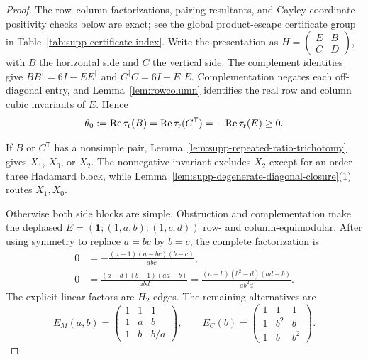 \begin{proof}
The row--column factorizations, pairing resultants, and Cayley-coordinate positivity checks below are exact; see the global product-escape certificate group in Table~\ref{tab:supp-certificate-index}.
{Write the presentation as $H=\left(\begin{smallmatrix}E&B\\C&D\end{smallmatrix}\right)$, with $B$ the horizontal side and $C$ the vertical side.  The complement identities give $BB^\dagger=6I-EE^\dagger$ and $C^\dagger C=6I-E^\dagger E$.  Complementation negates each off-diagonal entry, and Lemma~\ref{lem:rowcolumn} identifies the real row and column cubic invariants of $E$. Hence}
\begin{equation}
{\theta_0:=\operatorname{Re}\tau_{\rm r}(B)
=\operatorname{Re}\tau_{\rm r}(C^{\mathsf T})
=-\operatorname{Re}\tau_{\rm r}(E)\ge0.}
\label{eq:supp-two-sided-common-invariant}
\end{equation}

{If $B$ or $C^{\mathsf T}$ has a nonsimple pair, Lemma~\ref{lem:supp-repeated-ratio-trichotomy} gives $X_1$, $X_0$, or $X_2$.  The nonnegative invariant excludes $X_2$ except for an order-three Hadamard block, while Lemma~\ref{lem:supp-degenerate-diagonal-closure}(1) routes $X_1,X_0$.}

{Otherwise both side blocks are simple.  Obstruction and complementation make the dephased $E=(\mathbf1;(1,a,b);(1,c,d))$ row- and column-equimodular.  After using symmetry to replace $a=bc$ by $b=c$, the complete factorization is}
\begin{align}
{0}&{=-\frac{(a+1)(a-bc)(b-c)}{abc},}
\label{eq:supp-biequimodular-first-split}\\
{0}&{=\frac{(a-d)(b+1)(ad-b)}{abd}
=\frac{(a+b)(b^2-d)(ad-b)}{ab^2d}.}
\label{eq:supp-biequimodular-second-split}
\end{align}
{The explicit linear factors are $H_2$ edges. The remaining alternatives are}
\begin{equation}
{E_M(a,b)=\begin{pmatrix}1&1&1\\1&a&b\\1&b&b/a\end{pmatrix},
\qquad
E_C(b)=\begin{pmatrix}1&1&1\\1&b^2&b\\1&b&b^2\end{pmatrix}.}
\label{eq:supp-biequimodular-two-forms}
\end{equation}


\end{proof}
